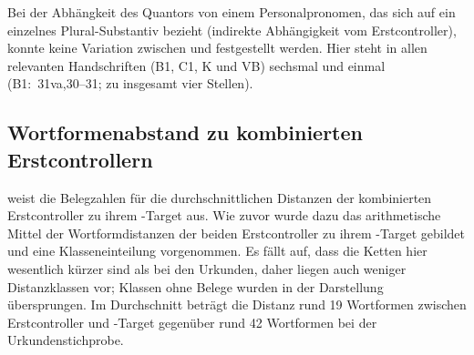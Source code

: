 Bei der Abhängkeit des Quantors von einem Personalpronomen, das sich auf ein
einzelnes Plural-Substantiv bezieht (indirekte Abhängigkeit vom
Erstcontroller), konnte keine Variation zwischen  und 
festgestellt werden. Hier steht in allen relevanten Handschriften (B1, C1, K
und VB) sechsmal  und einmal  (B1:~31va,30--31; zu
insgesamt vier Stellen).

\subsection{Wortformenabstand zu kombinierten Erstcontrollern}

 weist die Belegzahlen für die durchschnittlichen Distanzen
der kombinierten Erstcontroller zu ihrem -Target aus. Wie zuvor
wurde dazu das arithmetische Mittel der Wortformdistanzen der beiden
Erstcontroller zu ihrem -Target gebildet und eine
Klasseneinteilung vorgenommen. Es fällt auf, dass die Ketten hier wesentlich
kürzer sind als bei den Urkunden, daher liegen auch weniger Distanzklassen vor;
Klassen ohne Belege wurden in der Darstellung übersprungen. Im
Durchschnitt beträgt die Distanz rund 19 Wortformen zwischen Erstcontroller und
-Target gegenüber rund 42 Wortformen bei der Urkundenstichprobe.

